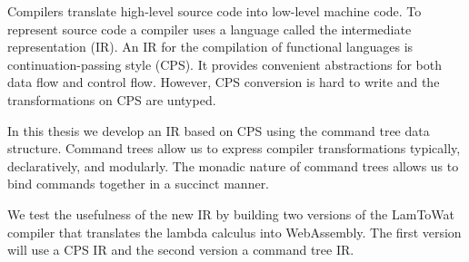 
Compilers translate high-level source code into low-level machine code. To represent source code a compiler uses a language called the intermediate representation (IR). An IR for the compilation of functional languages is continuation-passing style (CPS). It provides convenient abstractions for both data flow and control flow. However, CPS conversion is hard to write and the transformations on CPS are untyped.

In this thesis we develop an IR based on CPS using the command tree data structure. Command trees allow us to express compiler transformations typically, declaratively, and modularly. The monadic nature of command trees allows us to bind commands together in a succinct manner.

We test the usefulness of the new IR by building two versions of the LamToWat compiler that translates the lambda calculus into WebAssembly. The first version will use a CPS IR and the second version a command tree IR.